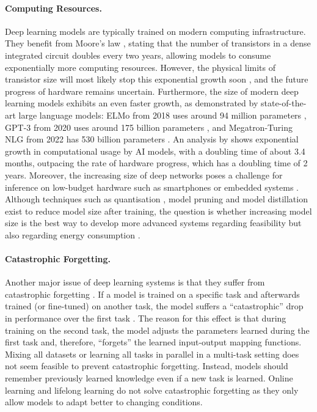 \paragraph{Computing Resources.} Deep learning models are typically trained on modern computing infrastructure. They benefit from Moore's law , stating that the number of transistors in a dense integrated circuit doubles every two years, allowing models to consume exponentially more computing resources. However, the physical limits of transistor size will most likely stop this exponential growth soon , and the future progress of hardware remains uncertain.
Furthermore, the size of modern deep learning models exhibits an even faster growth, as demonstrated by state-of-the-art large language models: 
ELMo from 2018 uses around 94 million parameters , 
GPT-3 from 2020 uses around 175 billion parameters , and Megatron-Turing NLG from 2022 has 530 billion parameters \cite{smith_using_2022}.
An analysis by  shows exponential growth in computational usage by AI models, with a doubling time of about 3.4 months, outpacing the rate of hardware progress, which has a doubling time of 2 years. Moreover, the increasing size of deep networks poses a challenge for inference on low-budget hardware such as smartphones or embedded systems \cite{berthelier_deep_2021}. Although techniques such as quantisation \cite{wu_integer_2020}, model pruning  and model distillation  exist to reduce model size after training, the question is whether increasing model size is the best way to develop more advanced systems regarding feasibility but also regarding energy consumption .

\paragraph{Catastrophic Forgetting.} Another major issue of deep learning systems is that they suffer from catastrophic forgetting .
If a model is trained on a specific task and afterwards trained (or fine-tuned) on another task, the model suffers a ``catastrophic'' drop in performance over the first task \cite{kirkpatrick_overcoming_2017}.
The reason for this effect is that during training on the second task, the model adjusts the parameters learned during the first task and, therefore, ``forgets'' the learned input-output mapping functions.
Mixing all datasets or learning all tasks in parallel in a multi-task setting  does not seem feasible to prevent catastrophic forgetting. Instead, models should remember previously learned knowledge even if a new task is learned.
Online learning \cite{sahoo_online_2018} and lifelong learning \cite{parisi_continual_2019} do not solve catastrophic forgetting as they only allow models to adapt better to changing conditions.

